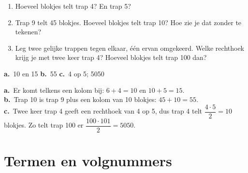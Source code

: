 \begin{oefeningen}[Start]
\begin{oefening}
\begin{enumerate}
  \item Hoeveel blokjes telt trap 4? En trap 5?
  \item Trap 9 telt 45 blokjes. Hoeveel blokjes telt trap 10? Hoe zie je dat zonder te tekenen?
  \item Leg twee gelijke trappen tegen elkaar, één ervan omgekeerd. Welke rechthoek krijg je met twee keer trap 4? Hoeveel blokjes telt trap 100 dan?
\end{enumerate}
\begin{solution}
\textbf{a.}~10 en 15 \quad \textbf{b.}~55 \quad \textbf{c.}~4 op 5; 5050
\end{solution}
\begin{fullsolution}
\textbf{a.}~Er komt telkens een kolom bij: $6+4=10$ en $10+5=15$.\\
\textbf{b.}~Trap 10 is trap 9 plus een kolom van 10 blokjes: $45+10=55$.\\
\textbf{c.}~Twee keer trap 4 geeft een rechthoek van 4 op 5, dus trap 4 telt $\dfrac{4\cdot 5}{2}=10$ blokjes. Zo telt trap 100 er $\dfrac{100\cdot 101}{2}=5050$.
\end{fullsolution}
\end{oefening}
\end{oefeningen}


\section{Termen en volgnummers}

